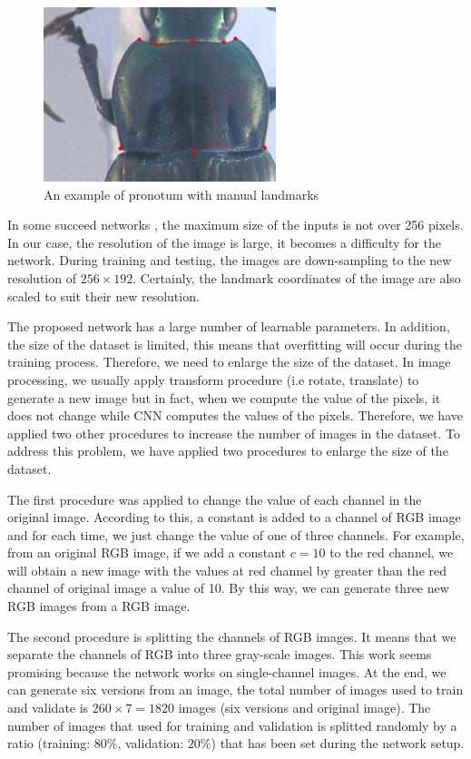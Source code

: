 \documentclass[conference]{IEEEtran}
\begin{document}
\begin{figure}[htbp]
	\centerline{\includegraphics[scale=0.8]{images/pronotum}}
	\caption{An example of pronotum with manual landmarks}
	\label{figpronotum}
\end{figure}

In some succeed networks \cite{krizhevsky2012imagenet}\cite{sun2013deep}\cite{cintas2016automatic}, the maximum size of the inputs is not over 256 pixels. In our case, the resolution of the image is large, it becomes a difficulty for the network. During training and testing, the images are down-sampling to the new resolution of $256 \times 192$. Certainly, the landmark coordinates of the image are also scaled to suit their new resolution. 

The proposed network has a large number of learnable parameters. In addition, the size of the dataset is limited, this means that overfitting will occur during the training process. Therefore, we need to enlarge the size of the dataset. In image processing, we usually apply transform procedure (i.e rotate, translate) to generate a new image but in fact, when we compute the value of the pixels, it does not change while CNN computes the values of the pixels. Therefore, we have applied two other procedures to increase the number of images in the dataset. To address this problem, we have applied two procedures to enlarge the size of the dataset.

The first procedure was applied to change the value of each channel in the original image. According to this, a constant is added to a channel of RGB image and for each time, we just change the value of one of three channels. For example, from an original RGB image, if we add a constant $c = 10$ to the red channel, we will obtain a new image with the values at red channel by greater than the red channel of original image a value of 10. By this way, we can generate three new RGB images from a RGB image.

The second procedure is splitting the channels of RGB images. It means that we separate the channels of RGB into three gray-scale images. This work seems promising because the network works on single-channel images. At the end, we can generate six versions from an image, the total number of images used to train and validate is $260 \times 7 = 1820$ images (six versions and original image). The number of images that used for training and validation is splitted randomly by a ratio (training: $80\%$, validation: $20\%$) that has been set during the network setup.
\end{document}
